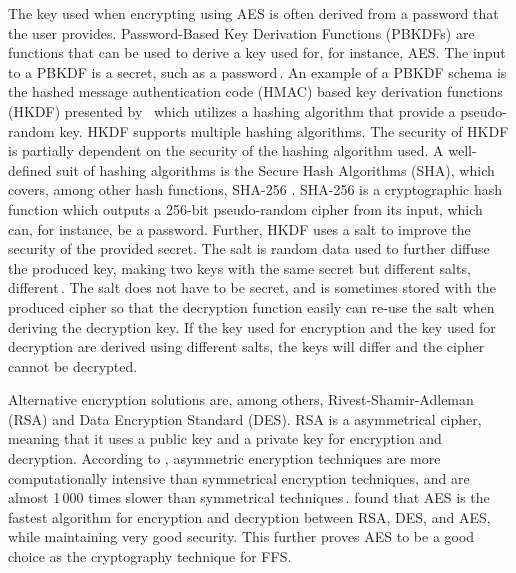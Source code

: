 The key used when encrypting using AES is often derived from a password that the user provides. Password-Based Key Derivation Functions (\gls{PBKDF}s) are functions that can be used to derive a key used for, for instance, AES. The input to a PBKDF is a secret, such as a password\,\cite{kodwaniSecurityKeyDerivation2021}. An example of a PBKDF schema is the hashed message authentication code (\gls{HMAC}) based key derivation functions (\gls{HKDF}) presented by \citeauthor{krawczykCryptographicExtractionKey2010}\,\cite{krawczykCryptographicExtractionKey2010}\cite{krawczykHMACbasedExtractandExpandKey2010} which utilizes a hashing algorithm that provide a pseudo-random key. HKDF supports multiple hashing algorithms. The security of HKDF is partially dependent on the security of the hashing algorithm used. A well-defined suit of hashing algorithms is the Secure Hash Algorithms (\gls{SHA}), which covers, among other hash functions, SHA-256 \cite{hansenUSSecureHash2011}. SHA-256 is a cryptographic hash function which outputs a 256-bit pseudo-random cipher from its input, which can, for instance, be a password. Further, HKDF uses a salt to improve the security of the provided secret. The salt is random data used to further diffuse the produced key, making two keys with the same secret but different salts, different\,\cite{ariasAddingSaltHashing2021}. The salt does not have to be secret, and is sometimes stored with the produced cipher so that the decryption function easily can re-use the salt when deriving the decryption key. If the key used for encryption and the key used for decryption are derived using different salts, the keys will differ and the cipher cannot be decrypted.

Alternative encryption solutions are, among others, Rivest-Shamir-Adleman (\gls{RSA}) and Data Encryption Standard (\gls{DES}). RSA is a asymmetrical cipher, meaning that it uses a public key and a private key for encryption and decryption. According to \citeauthor{mahajanStudyEncryptionAlgorithms2013}, asymmetric encryption techniques are more computationally intensive than symmetrical encryption techniques, and are almost 1\,000 times slower than symmetrical techniques\,\cite{mahajanStudyEncryptionAlgorithms2013}. \citeauthor{mahajanStudyEncryptionAlgorithms2013} found that AES is the fastest algorithm for encryption and decryption between RSA, DES, and AES, while maintaining very good security. This further proves AES to be a good choice as the cryptography technique for FFS.